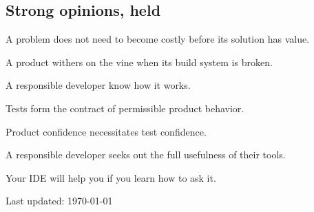 \documentclass[10pt,letterpaper]{article}
\newcommand\ttt\texttt
\renewenvironment{itemize}{
  \begin{list}{}{
    \setlength{\leftmargin}{1.5em}
    \setlength{\itemsep}{0.25em}
    \setlength{\parskip}{0pt}
    \setlength{\parsep}{0.25em}
  }
}{
  \end{list}
}
\begin{document}
\newcommand{\opinionsPar}{\par\vspace{-.3em}\quad}

\subsection*{Strong opinions, held}
\begin{itemize}
  \item A problem does not need to become costly before its solution has value.
  \item A product withers on the vine when its build system is broken.\opinionsPar
    A responsible developer know how it works.
  \item Tests form the contract of permissible product behavior.\opinionsPar
    Product confidence necessitates test confidence.
  \item A responsible developer seeks out the full usefulness of their tools.\opinionsPar
    Your IDE will help you if you learn how to ask it.
\end{itemize}

%

\vfill
\begin{center}
  \begin{small}
    Last updated: \today
  \end{small}
\end{center}
\end{document}
